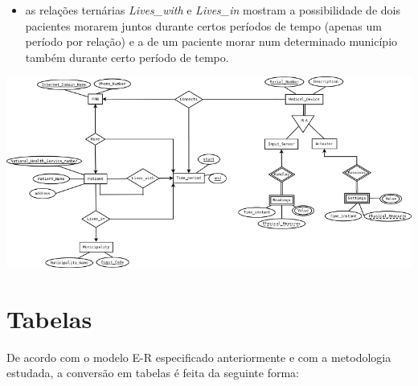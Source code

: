 \documentclass[a4paper]{article}
\begin{document}
\begin{itemize}
	 \item as relações ternárias \textit{Lives\_with} e \textit{Lives\_in} mostram a possibilidade de dois pacientes morarem juntos
	 durante certos períodos de tempo (apenas um período por relação) e a de um paciente morar num determinado município também durante certo período de tempo.
\end{itemize}

\pagebreak
\begin{landscape}
\includegraphics{Diagrama1.png}
\end{landscape}
\pagebreak

\section{Tabelas}
De acordo com o modelo E-R especificado anteriormente e com a metodologia estudada, a conversão em tabelas é feita da seguinte forma:
\end{document}
